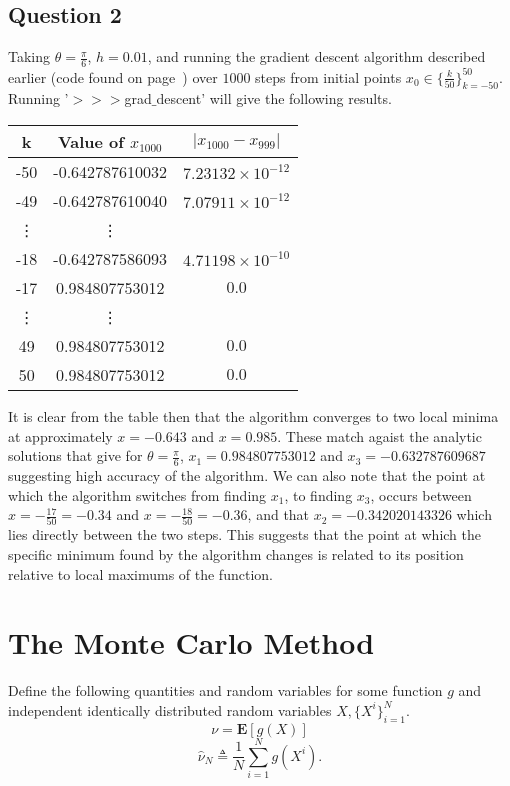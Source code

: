 \documentclass{article}
\begin{document}
\subsection{Question 2}
Taking $\theta=\frac{\pi}{6}$, $h=0.01$, and running the gradient descent algorithm described earlier (code found on page~\pageref{subsec:Program 1}) over $1000$ steps from initial points $x_0 \in \{\frac{k}{50}\}_{k=-50}^{50}$. Running '$>>>$grad$\_$descent' will give the following results.
\begin{center}
\begin{tabular}{ c c c } 
 k & Value of $x_{1000}$ & $|x_{1000}-x_{999}|$ \\
\hline 
 -50 & -0.642787610032 & $7.23132 \times 10^{-12}$\\ 
 -49 & -0.642787610040 & $7.07911 \times 10^{-12}$ \\
 \vdots & \vdots \\
-18 & -0.642787586093 & $4.71198 \times 10^{-10}$ \\
-17 & 0.984807753012 & $0.0$ \\
\vdots & \vdots \\
49 & 0.984807753012 & $0.0$ \\
50 & 0.984807753012 & $0.0$ \\ 
\end{tabular}
\end{center}
It is clear from the table then that the algorithm converges to two local minima at approximately $x=-0.643$ and $x=0.985$. These match agaist the analytic solutions that give for $\theta=\frac{\pi}{6}$, $x_1 = 0.984807753012$ and $x_3= -0.632787609687$ suggesting high accuracy of the algorithm. We can also note that the point at which the algorithm switches from finding $x_1$, to finding $x_3$, occurs between $x=-\frac{17}{50}=-0.34$ and $x=-\frac{18}{50}=-0.36$, and that $x_2=-0.342020143326$ which lies directly between the two steps. This suggests that the point at which the specific minimum found by the algorithm changes is related to its position relative to local maximums of the function. 

\section{The Monte Carlo Method}

Define the following quantities and random variables for some function $g$ and independent identically distributed random variables $X, \{X^i\}_{i=1}^N$.
\begin{equation}
\nu =\textbf{E} [g(X)]
\end{equation}
\begin{equation}
\hat{\nu}_N \triangleq \frac{1}{N} \sum_{i=1}^Ng(X^i).
\end{equation}
\end{document}
